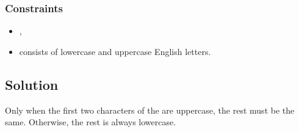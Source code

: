\documentclass[letterpaper,12pt,english]{book}
\begin{document}
\subsubsection{Constraints}
\label{\detokenize{String/08_STR_520_Detect_Capital:constraints}}\begin{itemize}
\item {} 
\sphinxAtStartPar
{},

\item {} 
\sphinxAtStartPar
{} consists of lowercase and uppercase English letters.

\end{itemize}


\subsection{Solution}
\label{\detokenize{String/08_STR_520_Detect_Capital:solution}}
\sphinxAtStartPar
Only when the first two characters of the  are uppercase, the rest must be the same.
Otherwise, the rest is always lowercase.
\end{document}
